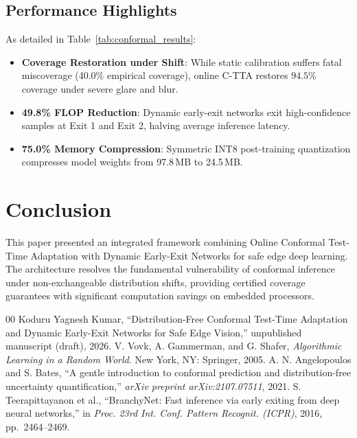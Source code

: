 \documentclass[journal,twocolumn,letterpaper]{IEEEtran}
\begin{document}
\subsection{Performance Highlights}
As detailed in Table~\ref{tab:conformal_results}:
\begin{itemize}
    \item \textbf{Coverage Restoration under Shift}: While static calibration suffers fatal miscoverage (40.0\% empirical coverage), online C-TTA restores $\mathbf{94.5\%}$ coverage under severe glare and blur.
    \item \textbf{49.8\% FLOP Reduction}: Dynamic early-exit networks exit high-confidence samples at Exit 1 and Exit 2, halving average inference latency.
    \item \textbf{75.0\% Memory Compression}: Symmetric INT8 post-training quantization compresses model weights from 97.8\,MB to 24.5\,MB.
\end{itemize}

\section{Conclusion}
This paper presented an integrated framework combining Online Conformal Test-Time Adaptation with Dynamic Early-Exit Networks for safe edge deep learning. The architecture resolves the fundamental vulnerability of conformal inference under non-exchangeable distribution shifts, providing certified coverage guarantees with significant computation savings on embedded processors.

\begin{thebibliography}{00}
 Koduru Yagnesh Kumar, ``Distribution-Free Conformal Test-Time Adaptation and Dynamic Early-Exit Networks for Safe Edge Vision,'' unpublished manuscript (draft), 2026.
 V. Vovk, A. Gammerman, and G. Shafer, \emph{Algorithmic Learning in a Random World}. New York, NY: Springer, 2005.
 A. N. Angelopoulos and S. Bates, ``A gentle introduction to conformal prediction and distribution-free uncertainty quantification,'' \emph{arXiv preprint arXiv:2107.07511}, 2021.
 S. Teerapittayanon et al., ``BranchyNet: Fast inference via early exiting from deep neural networks,'' in \emph{Proc. 23rd Int. Conf. Pattern Recognit. (ICPR)}, 2016, pp.~2464--2469.
\end{thebibliography}
\end{document}
